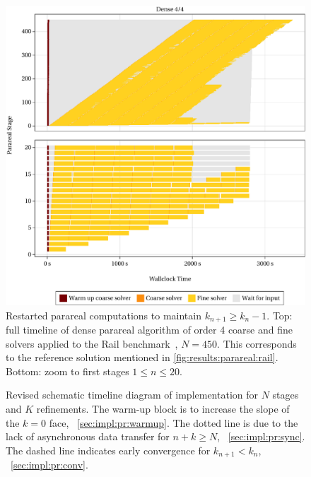 \begin{figure}[tp]
  \centering
  \includegraphics[width=\textwidth]{figures/fig_timeline_ref.pdf}
  \caption[Restarted parareal computation]{
    Restarted parareal computations to maintain $k_{n+1} \geq k_n - 1$.
    Top: full timeline of dense parareal algorithm of order 4 coarse and fine solvers applied to the Rail benchmark~\cite{morwiki_steel}, $N=450$.
    This corresponds to the reference solution mentioned in \autoref{fig:results:parareal:rail}.
    Bottom: zoom to first stages $1 \leq n \leq 20$.
  }
  \label{fig:impl:restart}
\end{figure}

\begin{figure}[t]
  \centering
  
  \caption[Revised schematic timeline diagram]{%
    Revised schematic timeline diagram of  implementation for $N$ stages and $K$ refinements.
    The warm-up block is to increase the slope of the $k=0$ face,
    \cf~\autoref{sec:impl:pr:warmup}.
    The dotted line is due to the lack of asynchronous data transfer for $n+k \geq N$,
    \cf~\autoref{sec:impl:pr:sync}.
    The dashed line indicates early convergence for $k_{n+1} < k_n$,
    \cf~\autoref{sec:impl:pr:conv}.
  }
  \label{fig:timeline:revised}
\end{figure}

